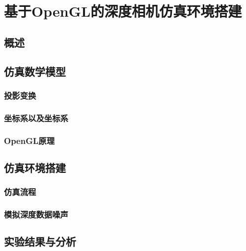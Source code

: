 \chapter{基于OpenGL的深度相机仿真环境搭建}

\section{概述}

\section{仿真数学模型}
\subsection{投影变换}
\subsection{坐标系以及坐标系} %
\subsection{OpenGL原理} %

\section{仿真环境搭建}
\subsection{仿真流程} %
\subsection{模拟深度数据噪声} %

\section{实验结果与分析}
